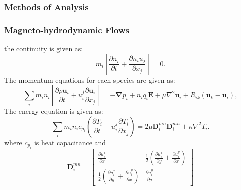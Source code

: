 \documentclass{fancyslides}
\begin{document}
 
\begin{frame}
\frametitle{Methods of Analysis}
\end{frame}


\begin{frame}
 \frametitle{Magneto-hydrodynamic Flows}
 the continuity is given as:
\begin{equation}
\label{eq:1}
m_i\left [\frac{\partial n_i}{\partial t}+\frac{\partial n_i u_j  }{\partial x_j}\right ]=0. 
\end{equation}
The momentum equations for each species are given as:
\begin{equation}
\label{eq:2}
 \sum_{i} m_i n_i \left [\frac{\partial \rho \mathbf{u}_i}{\partial t}+ u_{i}^{j}\frac{\partial \mathbf{u}_i}{\partial x_j}    \right ]=-\mathbf{\nabla}p_i+n_i q_i \mathbf{E}+\mu \nabla^2 \mathbf{u}_i+R_{ik}(\mathbf{u}_k-\mathbf{u}_i),
\end{equation}
The energy equation\cite{UCL} is given as:
\begin{equation}
\label{eq:3}
\sum_{i} m_i n_i c_{p_i} \left ( \frac{\partial T_i}{\partial t}+u_{i}^{j}\frac{\partial T_i}{\partial x_j}\right )=2\mu \mathbf{D}_{i}^{mn}\mathbf{D}_{i}^{mn}+\kappa \nabla^2 T_i.
\end{equation}
where  $c_{p_i}$ is heat capacitance and
\begin{equation}
\label{eq:4}
\mathbf{D}_{i}^{mn}=
\begin{bmatrix}
\frac{\partial u_{i}^{x}}{\partial x} & \frac{1}{2}(\frac{\partial u_{i}^{x}}{\partial y}+\frac{\partial u_{i}^{y}}{\partial x}) \\ 
\frac{1}{2}(\frac{\partial u_{i}^{x}}{\partial y}+\frac{\partial u_{i}^{y}}{\partial x}) & \frac{\partial u_{i}^{y}}{\partial y} 
\end{bmatrix}
\end{equation}
\end{frame}
\end{document}
